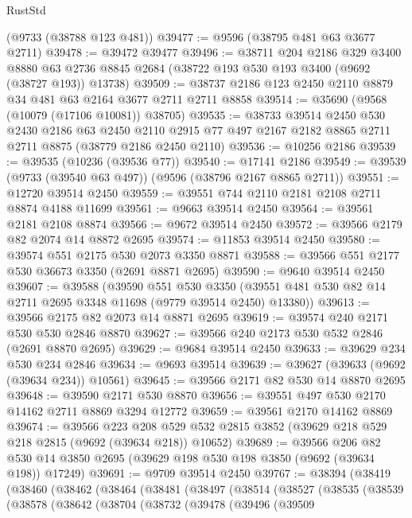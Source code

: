 \begin{lexlean}{RustStd}
\begin{coremodule}
{\begin{coremodule}
{{{{{{{{{{{{{{{{{{{{{{{{{{{{{{{{{{{{{{{{{{{{{{{{{{{{{{{    (@9733 (@38788 @123 @481))
@39477 := @9596 (@38795 @481 @63 @3677 @2711)
@39478 := @39472 @39477
@39496 := @38711
    @204
    @2186
    @329
    @3400
    @8880
    @63
    @2736
    @8845
    @2684
    (@38722 @193 @530 @193 @3400 (@9692 (@38727 @193)) @13738)
@39509 := @38737 @2186 @123 @2450 @2110 @8879 @34 @481 @63 @2164 @3677 @2711 @2711 @8858
@39514 := @35690 (@9568 (@10079 (@17106 @10081)) @38705)
@39535 := @38733
    @39514
    @2450
    @530
    @2430
    @2186
    @63
    @2450
    @2110
    @2915
    @77
    @497
    @2167
    @2182
    @8865
    @2711
    @2711
    @8875
    (@38779 @2186 @2450 @2110)
@39536 := @10256 @2186
@39539 := @39535 (@10236 (@39536 @77))
@39540 := @17141 @2186
@39549 := @39539 (@9733 (@39540 @63 @497)) (@9596 (@38796 @2167 @8865 @2711))
@39551 := @12720 @39514 @2450
@39559 := @39551 @744 @2110 @2181 @2108 @2711 @8874 @4188 @11699
@39561 := @9663 @39514 @2450
@39564 := @39561 @2181 @2108 @8874
@39566 := @9672 @39514 @2450
@39572 := @39566 @2179 @82 @2074 @14 @8872 @2695
@39574 := @11853 @39514 @2450
@39580 := @39574 @551 @2175 @530 @2073 @3350 @8871
@39588 := @39566 @551 @2177 @530 @36673 @3350 (@2691 @8871 @2695)
@39590 := @9640 @39514 @2450
@39607 := @39588
    (@39590
      @551
      @530
      @3350
      (@39551 @481 @530 @82 @14 @2711 @2695 @3348 @11698 (@9779 @39514 @2450) @13380))
@39613 := @39566 @2175 @82 @2073 @14 @8871 @2695
@39619 := @39574 @240 @2171 @530 @530 @2846 @8870
@39627 := @39566 @240 @2173 @530 @532 @2846 (@2691 @8870 @2695)
@39629 := @9684 @39514 @2450
@39633 := @39629 @234 @530 @234 @2846
@39634 := @9693 @39514
@39639 := @39627 (@39633 (@9692 (@39634 @234)) @10561)
@39645 := @39566 @2171 @82 @530 @14 @8870 @2695
@39648 := @39590 @2171 @530 @8870
@39656 := @39551 @497 @530 @2170 @14162 @2711 @8869 @3294 @12772
@39659 := @39561 @2170 @14162 @8869
@39674 := @39566
    @223
    @208
    @529
    @532
    @2815
    @3852
    (@39629 @218 @529 @218 @2815 (@9692 (@39634 @218)) @10652)
@39689 := @39566
    @206
    @82
    @530
    @14
    @3850
    @2695
    (@39629 @198 @530 @198 @3850 (@9692 (@39634 @198)) @17249)
@39691 := @9709 @39514 @2450
@39767 := @38394
    (@38419
      (@38460
        (@38462
          (@38464
            (@38481
              (@38497
                (@38514
                  (@38527
                    (@38535
                      (@38539
                        (@38578
                          (@38642
                            (@38704
                              (@38732
                                (@39478
                                  (@39496
                                    (@39509
}}}}}}}}}}}}}}}}}}}}}}}}}}}}}}}}}}}}}}}}}}}}}}}}}}}}}}}
\end{coremodule}}
\end{coremodule}
\end{lexlean}
